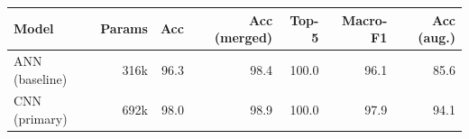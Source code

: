 \begin{tabular}{lrrrrrr}
\toprule
Model & Params & Acc & Acc (merged) & Top-5 & Macro-F1 & Acc (aug.) \\
\midrule
ANN (baseline) & 316k & 96.3 & 98.4 & 100.0 & 96.1 & 85.6 \\
CNN (primary) & 692k & 98.0 & 98.9 & 100.0 & 97.9 & 94.1 \\
\bottomrule
\end{tabular}
